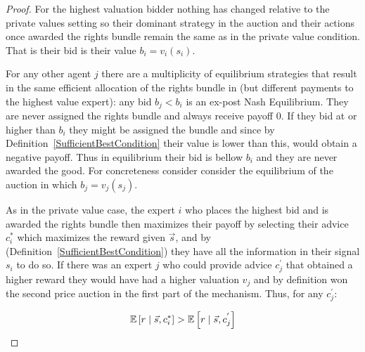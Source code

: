 \begin{proof}
For the highest valuation bidder nothing has changed relative to the private values setting so their dominant strategy in the auction and their actions once awarded the rights bundle remain the same as in the private value condition. That is their bid is their value $b_i = v_i(s_i)$.

For any other agent $j$ there are a multiplicity of equilibrium strategies that result in the same efficient allocation of the rights bundle in  (but different payments to the highest value expert): any bid $b_j < b_i$ is an ex-post Nash Equilibrium. They are never assigned the rights bundle and always receive payoff 0. If they bid at or higher than $b_i$ they might be assigned the bundle and since by  Definition~\ref{SufficientBestCondition} their value is lower than this, would obtain a negative payoff. 
Thus in equilibrium their bid is bellow $b_i$ and they are never awarded the good. For concreteness consider consider the equilibrium of the auction in which $b_j = v_j(s_j)$.

As in the private value case, the expert $i$ who places the highest bid and is awarded the rights bundle then maximizes their payoff by selecting their advice $c^*_i$ which maximizes the reward given $\vec{s}$, and by (Definition~\ref{SufficientBestCondition}) they have all the information in their signal $s_i$ to do so. 
If there was an expert $j$ who could provide advice $c^{'}_j$ that obtained a higher reward they would have had a higher valuation $v_j$ and by definition won the second price auction in the first part of the mechanism. Thus, for any $c^{'}_j$:

$$
\operatorname*{\mathbb E} \left[r \mid \vec{s}, c^*_i \right]
>
\operatorname*{\mathbb E} \left[r \mid \vec{s}, c^{'}_j \right]
$$

\end{proof}





